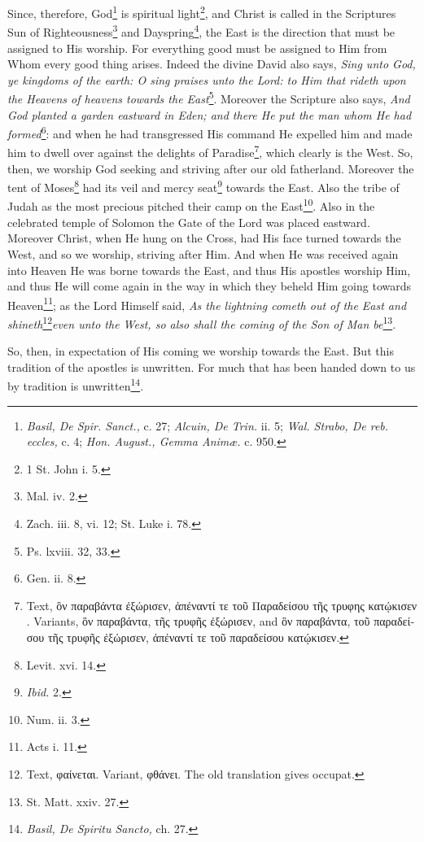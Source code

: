 Since, therefore, God\footnote{\emph{Basil, De Spir. Sanct., }c. 27; \emph{Alcuin, De Trin. }ii. 5; \emph{Wal. Strabo, De reb. eccles, }c. 4; \emph{Hon. August., Gemma Animæ. }c. 950.} is spiritual light\footnote{1 St. John i. 5.}, and Christ is called in the Scriptures Sun of Righteousness\footnote{Mal. iv. 2.} and Dayspring\footnote{Zach. iii. 8, vi. 12; St. Luke i. 78.}, the East is the direction that must be assigned to His worship. For everything good must be assigned to Him from Whom every good thing arises. Indeed the divine David also says, \emph{Sing unto God, ye kingdoms of the earth: O sing praises unto the Lord: to Him that rideth upon the Heavens of heavens towards the East}\footnote{Ps. lxviii. 32, 33.}. Moreover the Scripture also says, \emph{And God planted a garden eastward in Eden; and there He put the man whom He had formed}\footnote{Gen. ii. 8.}: and when he had transgressed His command He expelled him and made him to dwell over against the delights of Paradise\footnote{Text, \textgreek{ὃν παραβάντα ἐξώρισεν, ἀπέναντί τε τοῦ Παραδείσου τῆς τρυφης κατῴκισεν . }Variants\textgreek{, ὃν παραβάντα, τῆς τρυφῆς ἐξώρισεν,} and \textgreek{ὃν παραβάντα, τοῦ παραδείσου τῆς τρυφῆς ἐξώρισεν, ἀπέναντί τε τοῦ παραδείσου κατῴκισεν}.}, which clearly is the West. So, then, we worship God seeking and striving after our old fatherland. Moreover the tent of Moses\footnote{Levit. xvi. 14.} had its veil and mercy seat\footnote{\emph{Ibid.} 2.} towards the East. Also the tribe of Judah as the most precious pitched their camp on the East\footnote{Num. ii. 3.}. Also in the celebrated temple of Solomon the Gate of the Lord was placed eastward. Moreover Christ, when He hung on the Cross, had His face turned towards the West, and so we worship, striving after Him. And when He was received again into Heaven He was borne towards the East, and thus His apostles worship Him, and thus He will come again in the way in which they beheld Him going towards Heaven\footnote{Acts i. 11.}; as the Lord Himself said, \emph{As the lightning cometh out of the East and shineth}\footnote{Text, \textgreek{φαίνεται}. Variant, \textgreek{φθάνει}. The old translation gives occupat.}\emph{even unto the West, so also shall the coming of the Son of Man be}\footnote{St. Matt. xxiv. 27.}\emph{}.

So, then, in expectation of His coming we worship towards the East. But this tradition of the apostles is unwritten. For much that has been handed down to us by tradition is unwritten\footnote{\emph{Basil, De Spiritu Sancto, }ch. 27.}.

